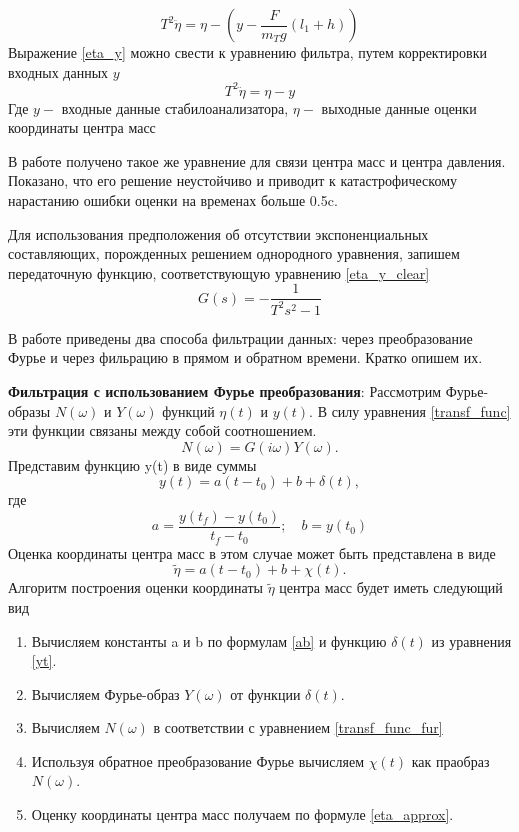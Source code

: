 \documentclass[a4paper,12pt, openany]{book}
\theoremstyle{plain} %
\theoremstyle{definition} %
\theoremstyle{remark} %
\numberwithin{equation}{chapter}
\begin{document}
{\begin{equation}\label{eta_y}
    T^2\ddot{\eta}=\eta-(y-\frac{F}{m_Tg}(l_1+h))
\end{equation}
Выражение \eqref{eta_y} можно свести к уравнению фильтра, путем корректировки входных данных $y$
\begin{equation}\label{eta_y_clear}
    T^2\ddot{\eta}=\eta-y
\end{equation}
Где $y -$  входные данные стабилоанализатора, $\eta -$ выходные данные оценки координаты центра масс

В работе \cite{kruchPodoprihin} получено такое же уравнение для связи центра масс и центра давления. Показано, что его решение неустойчиво и приводит к катастрофическому нарастанию ошибки оценки на временах больше 0.5c.

Для использования предположения об отсутствии экспоненциальных составляющих, порожденных решением однородного уравнения, запишем передаточную функцию, соответствующую
уравнению \eqref{eta_y_clear}
\begin{equation}\label{transf_func}
    G(s)=-\dfrac{1}{T^2s^2-1}
\end{equation}

В работе \cite{kruchPodoprihin} приведены два способа фильтрации данных: через преобразование Фурье и через фильрацию в прямом и обратном времени. Кратко опишем их.

\textbf{Фильтрация с использованием Фурье преобразования}: Рассмотрим Фурье-образы $N(\omega)$ и $Y(\omega)$ функций $\eta(t)$ и $y(t)$. В силу уравнения \eqref{transf_func} эти функции
связаны между собой соотношением.
\begin{equation}\label{transf_func_fur}
    N(\omega) = G(i\omega)Y(\omega).
\end{equation}
Представим функцию y(t) в виде суммы 
\begin{equation}\label{yt}
    y(t) = a(t - t_0) + b + \delta(t),
\end{equation}
где
\begin{equation}\label{ab}
    a=\dfrac{y(t_f)-y(t_0)}{t_f-t_0}; \quad b=y(t_0)
\end{equation}
Оценка координаты центра масс в этом случае
может быть представлена в виде
\begin{equation}\label{eta_approx}
    \tilde{\eta}= a(t-t_0)+b+\chi(t).
\end{equation}
Алгоритм построения оценки координаты $\tilde{\eta}$
центра масс будет иметь следующий вид
\begin{enumerate}
    \item Вычисляем константы a и b по формулам \eqref{ab}
    и функцию $\delta(t)$ из уравнения \eqref{yt}.
    \item Вычисляем Фурье-образ $Y(\omega)$ от функции
    $\delta(t)$.
    \item Вычисляем $N(\omega)$ в соответствии с уравнением \eqref{transf_func_fur}
    \item Используя обратное преобразование Фурье
    вычисляем $\chi(t)$ как праобраз $N(\omega)$.
    \item Оценку координаты центра масс получаем
    по формуле \eqref{eta_approx}.
\end{enumerate}

}
\end{document}
